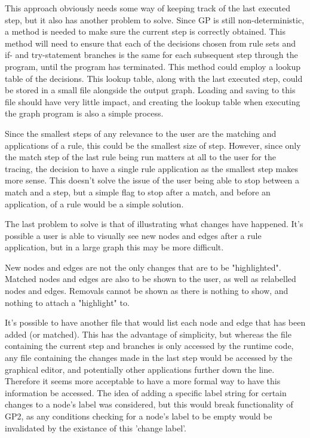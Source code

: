 \documentclass{UoYCSproject}
\begin{document}
This approach obviously needs some way of keeping track of the last executed step, but it also has another problem to solve. Since GP is still non-deterministic, a method is needed to make sure the current step is correctly obtained. This method will need to ensure that each of the decisions chosen from rule sets and if- and try-statement branches is the same for each subsequent step through the program, until the program has terminated. This method could employ a lookup table of the decisions. This lookup table, along with the last executed step, could be stored in a small file alongside the output graph. Loading and saving to this file should have very little impact, and creating the lookup table when executing the graph program is also a simple process.

Since the smallest steps of any relevance to the user are the matching and applications of a rule, this could be the smallest size of step. However, since only the match step of the last rule being run matters at all to the user for the tracing, the decision to have a single rule application as the smallest step makes more sense. This doesn't solve the issue of the user being able to stop between a match and a step, but a simple flag to stop after a match, and before an application, of a rule would be a simple solution.

The last problem to solve is that of illustrating what changes have happened. It's possible a user is able to visually see new nodes and edges after a rule application, but in a large graph this may be more difficult. 

New nodes and edges are not the only changes that are to be "highlighted". Matched nodes and edges are also to be shown to the user, as well as relabelled nodes and edges. Removals cannot be shown as there is nothing to show, and nothing to attach a "highlight" to.

It's possible to have another file that would list each node and edge that has been added (or matched). This has the advantage of simplicity, but whereas the file containing the current step and branches is only accessed by the runtime code, any file containing the changes made in the last step would be accessed by the graphical editor, and potentially other applications further down the line. Therefore it seems more acceptable to have a more formal way to have this information be accessed. The idea of adding a specific label string for certain changes to a node's label was considered, but this would break functionality of GP2, as any conditions checking for a node's label to be empty would be invalidated by the existance of this 'change label'.
\end{document}
